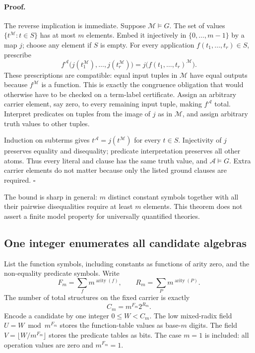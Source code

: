 \paragraph{Proof.}
The reverse implication is immediate.  Suppose $\mathcal M\models G$.
The set of values $\{t^{\mathcal M}:t\in S\}$ has at most $m$ elements.
Embed it injectively in $\{0,\ldots,m-1\}$ by a map $j$; choose any element
if $S$ is empty.  For every application $f(t_1,\ldots,t_r)\in S$, prescribe
\[
 f^{\mathcal A}\bigl(j(t_1^{\mathcal M}),\ldots,
                       j(t_r^{\mathcal M})\bigr)
   =j\bigl(f(t_1,\ldots,t_r)^{\mathcal M}\bigr).
\]
These prescriptions are compatible: equal input tuples in $\mathcal M$
have equal outputs because $f^{\mathcal M}$ is a function.  This is exactly
the congruence obligation that would otherwise have to be checked on a
term-label certificate.  Assign an arbitrary carrier element, say zero,
to every remaining input tuple, making $f^{\mathcal A}$ total.  Interpret
predicates on tuples from the image of $j$ as in $\mathcal M$, and assign
arbitrary truth values to other tuples.

Induction on subterms gives $t^{\mathcal A}=j(t^{\mathcal M})$ for every
$t\in S$.  Injectivity of $j$ preserves equality and disequality; predicate
interpretation preserves all other atoms.  Thus every literal and clause
has the same truth value, and $\mathcal A\models G$.  Extra carrier elements
do not matter because only the listed ground clauses are required.
\hfill$\square$

The bound is sharp in general: $m$ distinct constant symbols together with
all their pairwise disequalities require at least $m$ elements.  This theorem
does not assert a finite model property for universally quantified theories.

\subsection{One integer enumerates all candidate algebras}

List the function symbols, including constants as functions of arity zero,
and the non-equality predicate symbols.  Write
\[
 F_m=\sum_f m^{\operatorname{arity}(f)},\qquad
 R_m=\sum_P m^{\operatorname{arity}(P)}.
\]
The number of total structures on the fixed carrier is exactly
\[
 C_m=m^{F_m}2^{R_m}.
\]
Encode a candidate by one integer $0\le W<C_m$.  The low mixed-radix field
$U=W\bmod m^{F_m}$ stores the function-table values as base-$m$ digits.
The field $V=\lfloor W/m^{F_m}\rfloor$ stores the predicate tables as bits.
The case $m=1$ is included: all operation values are zero and $m^{F_m}=1$.

